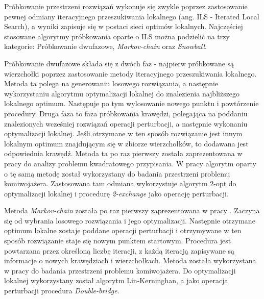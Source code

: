 Próbkowanie przestrzeni rozwiązań wykonuje się zwykle poprzez zastosowanie pewnej odmiany iteracyjnego przeszukiwania lokalnego
(ang. ILS - Iterated Local Search),
a wyniki zapisuje się w postaci sieci optimów lokalnych.
Najczęściej stosowane algorytmy próbkowania oparte o ILS można podzielić na trzy kategorie:
Próbkowanie dwufazowe, \textit{Markov-chain} oraz \textit{Snowball}.

Próbkowanie dwufazowe składa się z dwóch faz - najpierw próbkowane są wierzchołki poprzez zastosowanie metody iteracyjnego przeszukiwania lokalnego\cite{DBLP:journals/corr/OchoaVDT14}.
Metoda ta polega na generowaniu losowego rozwiązania, a następnie wykorzystaniu algorytmu optymalizacji lokalnej do znalezienia najbliższego
lokalnego optimum. Następuje po tym wylosowanie nowego punktu i powtórzenie procedury.
Druga faza to faza próbkowania krawędzi, polegająca na poddaniu znalezionych wcześniej rozwiązań operacji perturbacji, a następnie wykonaniu optymalizacji
lokalnej. Jeśli otrzymane w ten sposób rozwiązanie jest innym lokalnym optimum znajdującym się w zbiorze wierzchołków, to dodawana jest odpowiednia krawędź.
Metoda ta po raz pierwszy została zaprezentowana w pracy\cite{10.1145/2576768.2598275} do analizy problemu kwadratowego przypisania.
W pracy\cite{DBLP:conf/depcos/BozejkoGNAB18} algorytm oparty o tę samą metodę został wykorzystany do badania przestrzeni problemu komiwojażera.
Zastosowana tam odmiana wykorzystuje algorytm 2-opt do optymalizacji lokalnej i procedurę \textit{2-exchange} jako operację perturbacji.

Metoda \textit{Markov-chain} została po raz pierwszy zaprezentowana w pracy \cite{markovchain}.
Zaczyna się od wybrania losowego rozwiązania i jego optymalizacji. Następnie otrzymane optimum lokalne zostaje poddane operacji perturbacji
i otrzymywane w ten sposób rozwiązanie staje się nowym punktem startowym. Procedura jest powtarzana przez określoną liczbę iteracji, z każdą iteracją
zapisywane są informacje o nowych krawędziach i wierzchołkach.
Metoda została wykorzystana w pracy\cite{DBLP:journals/heuristics/OchoaV18} do badania przestrzeni problemu komiwojażera.
Do optymalizacji lokalnej wykorzystany został algorytm Lin-Kerninghan, a jako operacja perturbacji procedura \textit{Double-bridge}.

